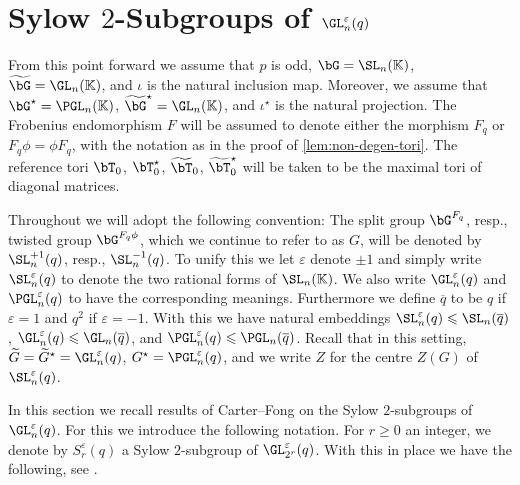 \documentclass[eqthmnum, nocolour]{jt-calcs}
\begin{document}
\section{Sylow $2$-Subgroups of $\GL_n^{\varepsilon}(q)$}\label{sec:sylow}
\begin{assumption}
From this point forward we assume that $p$ is odd, $\bG = \SL_n(\mathbb{K})$, $\widetilde{\bG} = \GL_n(\mathbb{K})$, and $\iota$ is the natural inclusion map. Moreover, we assume that $\bG^{\star} = \PGL_n(\mathbb{K})$, $\widetilde{\bG}^{\star} = \GL_n(\mathbb{K})$, and $\iota^{\star}$ is the natural projection. The Frobenius endomorphism $F$ will be assumed to denote either the morphism $F_q$ or $F_q\phi = \phi F_q$, with the notation as in the proof of \cref{lem:non-degen-tori}. The reference tori $\bT_0$, $\bT_0^{\star}$, $\widetilde{\bT}_0$, $\widetilde{\bT}_0^{\star}$ will be taken to be the maximal tori of diagonal matrices.
\end{assumption}

\begin{pa}
Throughout we will adopt the following convention: The split group $\bG^{F_q}$, resp., twisted group $\bG^{F_q\phi}$, which we continue to refer to as $G$, will be denoted by $\SL_n^{+1}(q)$, resp., $\SL_n^{-1}(q)$. To unify this we let $\varepsilon$ denote $\pm1$ and simply write $\SL_n^{\varepsilon}(q)$ to denote the two rational forms of $\SL_n(\mathbb{K})$. We also write $\GL_n^{\varepsilon}(q)$ and $\PGL_n^{\varepsilon}(q)$ to have the corresponding meanings. Furthermore we define $\overline{q}$ to be $q$ if $\varepsilon = 1$ and $q^2$ if $\varepsilon = -1$. With this we have natural embeddings $\SL_n^{\varepsilon}(q) \leqslant \SL_n(\overline{q})$, $\GL_n^{\varepsilon}(q) \leqslant \GL_n(\overline{q})$, and $\PGL_n^{\varepsilon}(q) \leqslant \PGL_n(\overline{q})$.  Recall that in this setting, $\widetilde{G} = \widetilde{G}^\star = \GL_n^\varepsilon(q)$, $G^\star = \PGL^\varepsilon_n(q)$, and we write $Z$ for the centre $Z(G)$ of $\SL_n^\varepsilon(q)$.
\end{pa}

\begin{pa}
In this section we recall results of Carter--Fong on the Sylow $2$-subgroups of $\GL_n^\varepsilon(q)$. For this we introduce the following notation.  For $r \geqslant 0$ an integer, we denote by $S_r^{\varepsilon}(q)$ a Sylow $2$-subgroup of $\GL_{2^r}^{\varepsilon}(q)$. With this in place we have the following, see \cite[Theorem 1, Theorem 4]{carter-fong:1964:the-Sylow-2-subgroups}.
\end{pa}
\end{document}
